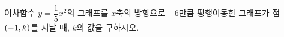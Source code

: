 이차함수 $y=\dfrac{1}{5}x^2$의 그래프를 $x$축의 방향으로 $-6$만큼 평행이동한 그래프가 점 $(-1{,}\mkern3mu\mathopen{}k)$를 지날 때, $k$의 값을 구하시오.

